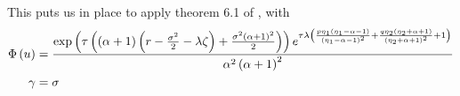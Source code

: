 \documentclass[11pt]{amsart}
\begin{document}
This puts us in place to apply theorem 6.1 of \cite{lee2004option}, with
\begin{align*}
\Phi \left( {u} \right) &= 
\frac{
\mathrm{exp}\left ( {
\tau
\left( { 
\left( {\alpha+1} \right)
\left( {r - \frac{\sigma^2}{2} - \lambda \zeta} \right)
+
\frac{ \sigma^2 \left( {\alpha+1} \right)^2 }{2}
} \right)
}\right )
e^{
\tau \lambda
\left( {
\frac{p \eta_1 \left( {\eta_1 - \alpha -1} \right)}{ \left( {\eta_1 -\alpha -1} \right)^2}
+
\frac{q \eta_2 \left( {\eta_2 + \alpha +1} \right)}{\left( {\eta_2+ \alpha +1} \right)^2}
+1
} \right)
}}
{\alpha^2 \left( {\alpha+1} \right)^2}
\\
\gamma & = \sigma
\end{align*}
\end{document}
